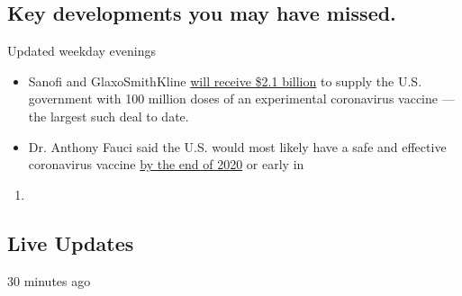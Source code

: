 \hypertarget{key-developments-you-may-have-missed}{%
\subsection{Key developments you may have
missed.}\label{key-developments-you-may-have-missed}}

Updated weekday evenings

\begin{itemize}
\tightlist
\item
  Sanofi and GlaxoSmithKline
  \href{https://www.nytimes3xbfgragh.onion/2020/07/31/health/covid-19-vaccine-sanofi-gsk.html}{will
  receive \$2.1 billion} to supply the U.S. government with 100 million
  doses of an experimental coronavirus vaccine --- the largest such deal
  to date.
\item
  Dr. Anthony Fauci said the U.S. would most likely have a safe and
  effective coronavirus vaccine
  \href{https://www.nytimes3xbfgragh.onion/aponline/2020/07/31/us/politics/ap-us-virus-outbreak-fauci.html}{by
  the end of 2020} or early in
\end{itemize}

\begin{enumerate}
\def\labelenumi{\arabic{enumi}.}
\setcounter{enumi}{2020}
\item
\end{enumerate}

\hypertarget{live-updates}{%
\subsection{Live Updates}\label{live-updates}}

30 minutes ago

